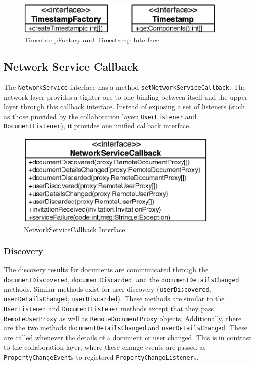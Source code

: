 \begin{figure}[H]
 \centering
 \includegraphics[width=10.30cm,height=1.55cm]{../images/finalreport/architecture_timestampfactory_uml.eps}
 \caption{TimestampFactory and Timestamp Interface}
\end{figure}


\subsection{Network Service Callback}
The \texttt{Network\-Service} interface has a method 
\texttt{set\-Network\-Service\-Callback}. The network layer provides a tighter
one-to-one binding between itself and the upper layer through this
callback interface. Instead of exposing a set of listeners
(such as those provided by the collaboration layer: \texttt{User\-Listener}
and \texttt{Document\-Listener}), it provides one unified callback interface.

\begin{figure}[H]
 \centering
 \includegraphics[width=9.81cm,height=4.52cm]{../images/finalreport/architecture_networkservicecallback_uml.eps}
 \caption{NetworkServiceCallback Interface}
\end{figure}


\subsubsection{Discovery}
\label{sect:archoverview.net.discovery}
The discovery results for documents are communicated through the 
\texttt{document\-Discovered}, \texttt{document\-Discarded}, and the
\texttt{document\-Details\-Changed} methods. Similar methods exist for user
discovery (\texttt{user\-Discovered}, \texttt{user\-Details\-Changed}, 
\texttt{user\-Discarded}). These methods are similar to the 
\texttt{User\-Listener} and \texttt{Document\-Listener} methods except that they
pass \texttt{Remote\-User\-Proxy} as well as \texttt{Remote\-Document\-Proxy} 
objects. Additionally, there are the two methods 
\texttt{document\-Details\-Changed}
and \texttt{user\-Details\-Changed}. These are called whenever the details of
a document or user changed. This is in contrast to the collaboration layer,
where these change events are passed as \texttt{Property\-Change\-Event}s to
registered \texttt{Property\-Change\-Listener}s.

